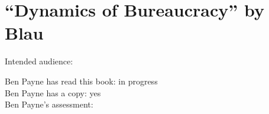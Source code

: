 \section{``Dynamics of Bureaucracy'' by Blau}

\cite{1955_Blau}

Intended audience:

Ben Payne has read this book: in progress\\
Ben Payne has a copy: yes\\
Ben Payne's assessment:

